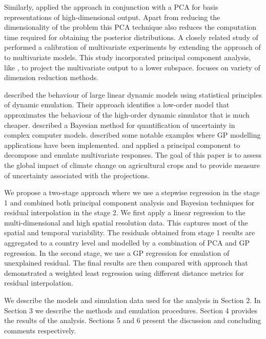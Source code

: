 Similarly, \cite{q23} applied the \cite{60} approach in conjunction with a PCA for basis representations of high-dimensional output. Apart from reducing the dimensionality of the problem this PCA technique also reduces the computation time required for obtaining the posterior distributions. A closely related study of \cite{80} performed a calibration of multivariate experiments by extending the approach of \cite{45} to multivariate models. This study incorporated principal component analysis, like \cite{q23}, to project the multivariate output to a lower subspace. \cite{10} focuses on variety of dimension reduction methods. 
 
\cite{83} described the behaviour of large linear dynamic models using statistical principles of dynamic emulation. Their approach identifies a low-order model that approximates the behaviour of the high-order dynamic simulator that is much cheaper. \cite{q5} described a Bayesian method for quantification of uncertainty in complex computer models. \cite{q17} described some notable examples where GP modelling applications have been implemented. \citet{q22} and \citet{q23} applied a principal component to decompose and emulate multivariate responses. The goal of this paper is to assess the global impact of climate change on agricultural crops and to provide measure of uncertainty associated with the projections.

We propose a two-stage approach where we use a stepwise regression in the stage 1  and combined both principal component analysis and Bayesian techniques for residual interpolation in the stage 2. We first apply a linear regression to the multi-dimensional and high spatial resolution data. This captures most of the spatial and temporal variability. The residuals obtained from stage 1 results are aggregated to a country level and modelled by a combination of PCA and GP regression. In the second stage, we use a GP regression for emulation of unexplained residual. The final results are then compared with \citet{qwole} approach that demonstrated a weighted least regression using different distance metrics for residual interpolation.

We describe the models and simulation data used for the analysis in Section 2. In Section 3 we describe the methods and emulation procedures. Section 4 provides the results of the analysis. Sections 5 and 6 present the discussion and concluding comments respectively.

